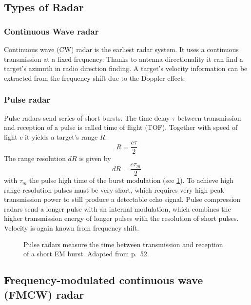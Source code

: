 \subsection{Types of Radar}\label{types-of-radar}

\subsubsection{Continuous Wave radar}\label{continuous-wave-cw-radar}

Continuous wave (CW) radar is the earliest radar system. It uses a continuous transmission
at a fixed frequency. Thanks to antenna directionality it can find a target's azimuth in radio direction finding. A target's velocity
information can be extracted from the frequency shift due to the Doppler
effect.

\subsubsection{Pulse radar}\label{pulse-radar}

Pulse radars send series of short bursts. The time delay \(\tau\)
between transmission and reception of a pulse is called time of flight
(TOF). Together with speed of light $c$ it yields a target's range \(R\):
\begin{equation} \label{eq:tof}
	 R = \frac{c\tau}{2} 
\end{equation}
The range resolution \(dR\) is given by
\begin{equation} \label{eq:tof_res}
	dR = \frac{c\tau_m}{2}
\end{equation}
with \(\tau_m\) the pulse high time of the burst modulation (see \cref{fig:radar_pulse}). To
achieve high range resolution pulses must be very short, which requires
very high peak transmission power to still produce a detectable echo
signal. Pulse compression radars send a longer pulse with an internal
modulation, which combines the higher transmission energy of longer
pulses with the resolution of short pulses. Velocity is again known from
frequency shift.

\begin{figure}[htp]
    \centering
    \def\svgwidth{10cm}
    
    \caption{Pulse radars measure the time between transmission and reception of a short EM burst. Adapted from \cite{Adams2012} p.~52.} \label{fig:radar_pulse}
\end{figure}


\subsection{Frequency-modulated continuous wave (FMCW) radar}\label{frequency-modulated-continuous-wave-fmcw-radar}

